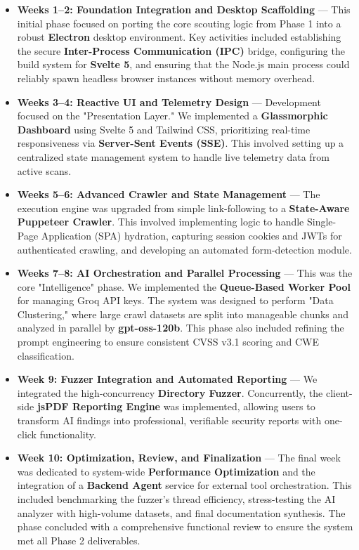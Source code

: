 \documentclass[12pt,oneside,a4paper]{book}
\begin{document}
\begin{itemize}
  \item \textbf{Weeks 1--2: Foundation Integration and Desktop Scaffolding} --- This initial phase focused on porting the core scouting logic from Phase 1 into a robust \textbf{Electron} desktop environment. Key activities included establishing the secure \textbf{Inter-Process Communication (IPC)} bridge, configuring the build system for \textbf{Svelte 5}, and ensuring that the Node.js main process could reliably spawn headless browser instances without memory overhead.
  
  \item \textbf{Weeks 3--4: Reactive UI and Telemetry Design} --- Development focused on the "Presentation Layer." We implemented a \textbf{Glassmorphic Dashboard} using Svelte 5 and Tailwind CSS, prioritizing real-time responsiveness via \textbf{Server-Sent Events (SSE)}. This involved setting up a centralized state management system to handle live telemetry data from active scans.
  
  \item \textbf{Weeks 5--6: Advanced Crawler and State Management} --- The execution engine was upgraded from simple link-following to a \textbf{State-Aware Puppeteer Crawler}. This involved implementing logic to handle Single-Page Application (SPA) hydration, capturing session cookies and JWTs for authenticated crawling, and developing an automated form-detection module.
  
  \item \textbf{Weeks 7--8: AI Orchestration and Parallel Processing} --- This was the core "Intelligence" phase. We implemented the \textbf{Queue-Based Worker Pool} for managing Groq API keys. The system was designed to perform "Data Clustering," where large crawl datasets are split into manageable chunks and analyzed in parallel by \textbf{gpt-oss-120b}. This phase also included refining the prompt engineering to ensure consistent CVSS v3.1 scoring and CWE classification.
  
  \item \textbf{Week 9: Fuzzer Integration and Automated Reporting} --- We integrated the high-concurrency \textbf{Directory Fuzzer}. Concurrently, the client-side \textbf{jsPDF Reporting Engine} was implemented, allowing users to transform AI findings into professional, verifiable security reports with one-click functionality.
  
  \item \textbf{Week 10: Optimization, Review, and Finalization} --- The final week was dedicated to system-wide \textbf{Performance Optimization} and the integration of a \textbf{Backend Agent} service for external tool orchestration. This included benchmarking the fuzzer's thread efficiency, stress-testing the AI analyzer with high-volume datasets, and final documentation synthesis. The phase concluded with a comprehensive functional review to ensure the system met all Phase 2 deliverables.
\end{itemize}
\end{document}
